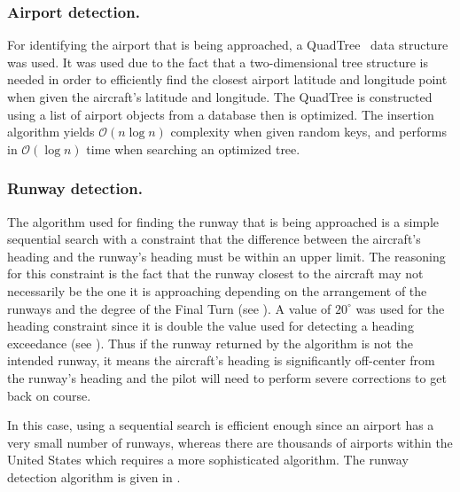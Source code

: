         
        \subsubsection{Airport detection.} \label{sec:detect_airport}
        
        	For identifying the airport that is being approached, a QuadTree~\cite{finkel1974quad} data structure was used.  It was used due to the fact that a two-dimensional tree structure is needed in order to efficiently find the closest airport latitude and longitude point when given the aircraft's latitude and longitude.  The QuadTree is constructed using a list of airport objects from a database then is optimized.  The insertion algorithm yields $\mathcal{O}(n \log n)$ complexity when given random keys, and performs in $\mathcal{O}(\log n)$ time when searching an optimized tree.


        \subsubsection{Runway detection.}
        
            The algorithm used for finding the runway that is being approached is a simple sequential search with a constraint that the difference between the aircraft's heading and the runway's heading must be within an upper limit.  The reasoning for this constraint is the fact that the runway closest to the aircraft may not necessarily be the one it is approaching depending on the arrangement of the runways and the degree of the Final Turn (see ).  A value of $20^\circ$ was used for the heading constraint since it is double the value used for detecting a heading exceedance (see ).  Thus if the runway returned by the algorithm is not the intended runway, it means the aircraft's heading is significantly off-center from the runway's heading and the pilot will need to perform severe corrections to get back on course.
            
            In this case, using a sequential search is efficient enough since an airport has a very small number of runways, whereas there are thousands of airports within the United States which requires a more sophisticated algorithm.  The runway detection algorithm is given in .

